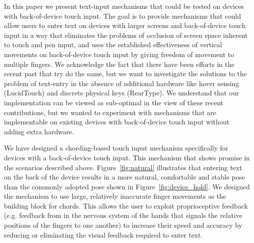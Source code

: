 In this paper we present text-input mechanisms that could be tested on devices with back-of-device touch input. The goal is to provide mechanisms that could allow users to enter text on devices with larger screens and back-of-device touch input in a way that eliminates the problems of occlusion of screen space inherent to touch and pen input, and uses the established effectiveness of vertical movements on back-of-device touch input  by giving freedom of movement to multiple fingers. We acknowledge the fact that there have been efforts in the recent past  that try do the same, but we want to investigate the solutions to the problem of text-entry in the absence of additional hardware like hover sensing (LucidTouch) and discrete physical keys (RearType). We understand that our implementation can be viewed as sub-optimal in the view of these recent contributions, but we wanted to experiment with mechanisms that are implementable on existing devices with back-of-device touch input without adding extra hardware.

We have designed a chording-based touch input mechanism specifically
for devices with a back-of-device touch input.  This mechanism that shows
promise in the scenarios described above.  Figure~\ref{fig:natural}
illustrates that entering text on the back of the device results in a
more natural, comfortable and stable pose than the commonly adopted
pose shown in Figure~\ref{fig:device_hold}.  We designed the mechanism
to use large, relatively inaccurate finger movements as the building
block for chords.  This allows the user to exploit proprioceptive
feedback (e.g. feedback from in the nervous system of the hands that
signals the relative positions of the fingers to one another) to
increase their speed and accuracy by reducing or eliminating the
visual feedback required to enter text. 

